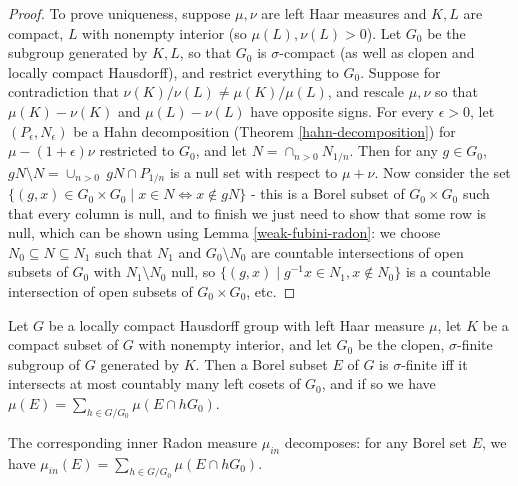 \documentclass[letterpaper,11pt]{report}
\begin{document}
\begin{proof}

To prove uniqueness, suppose $\mu, \nu$ are left Haar measures and $K,L$ are compact, $L$ with nonempty interior (so $\mu(L), \nu(L) > 0$). Let $G_0$ be the subgroup generated by $K, L$, so that $G_0$ is $\sigma$-compact (as well as clopen and locally compact Hausdorff), and restrict everything to $G_0$. Suppose for contradiction that $\nu(K)/\nu(L) \ne \mu(K)/\mu(L)$, and rescale $\mu,\nu$ so that $\mu(K) - \nu(K)$ and $\mu(L) - \nu(L)$ have opposite signs. For every $\epsilon > 0$, let $(P_\epsilon,N_\epsilon)$ be a Hahn decomposition (Theorem \ref{hahn-decomposition}) for $\mu-(1+\epsilon)\nu$ restricted to $G_0$, and let $N = \cap_{n > 0} N_{1/n}$. Then for any $g \in G_0$, $gN\setminus N = \cup_{n > 0}\ gN\cap P_{1/n}$ is a null set with respect to $\mu+\nu$. Now consider the set $\{(g,x) \in G_0\times G_0 \mid x \in N \iff x \not\in gN\}$ - this is a Borel subset of $G_0 \times G_0$ such that every column is null, and to finish we just need to show that some row is null, which can be shown using Lemma \ref{weak-fubini-radon}: we choose $N_0 \subseteq N \subseteq N_1$ such that $N_1$ and $G_0 \setminus N_0$ are countable intersections of open subsets of $G_0$ with $N_1\setminus N_0$ null, so $\{(g,x) \mid g^{-1}x \in N_1, x \not\in N_0\}$ is a countable intersection of open subsets of $G_0 \times G_0$, etc.
\end{proof}

\begin{prop} Let $G$ be a locally compact Hausdorff group with left Haar measure $\mu$, let $K$ be a compact subset of $G$ with nonempty interior, and let $G_0$ be the clopen, $\sigma$-finite subgroup of $G$ generated by $K$. Then a Borel subset $E$ of $G$ is $\sigma$-finite iff it intersects at most countably many left cosets of $G_0$, and if so we have $\mu(E) = \sum_{h \in G/G_0} \mu(E\cap hG_0)$.

The corresponding inner Radon measure $\mu_{in}$ decomposes: for any Borel set $E$, we have $\mu_{in}(E) = \sum_{h \in G/G_0} \mu(E\cap hG_0)$.
\end{prop}
\end{document}
